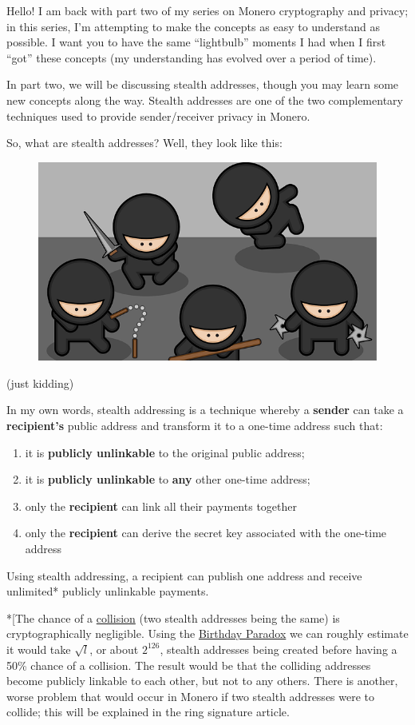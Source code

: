 Hello! I am back with part two of my series on Monero cryptography and privacy; in this series, I'm attempting to make the concepts as easy to understand as possible. I want you to have the same ``lightbulb'' moments I had when I first ``got'' these concepts (my understanding has evolved over a period of time).\par
In part two, we will be discussing stealth addresses, though you may learn some new concepts along the way. Stealth addresses are one of the two complementary techniques used to provide sender/receiver privacy in Monero.\par
So, what are stealth addresses? Well, they look like this:
\begin{figure}[H]
	\centering
	\includegraphics[width=0.8\linewidth]{./images/blog-series/xmr-crypto-luigi1111/stealth-address-kidding.png}
\end{figure}
(just kidding)\par
In my own words, stealth addressing is a technique whereby a \textbf{sender} can take a \textbf{recipient's} public address and transform it to a one-time address such that:
\begin{enumerate}
	\item it is \textbf{publicly unlinkable} to the original public address;
	\item it is \textbf{publicly unlinkable} to \textbf{any} other one-time address;
	\item only the \textbf{recipient} can link all their payments together
	\item only the \textbf{recipient} can derive the secret key associated with the one-time address
\end{enumerate}
Using stealth addressing, a recipient can publish one address and receive unlimited* publicly unlinkable payments.\par

*[The chance of a \href{https://en.wikipedia.org/wiki/Collision_(computer_science)}{collision} (two stealth addresses being the same) is cryptographically negligible. Using the \href{https://en.wikipedia.org/wiki/Birthday_problem}{Birthday Paradox} we can roughly estimate it would take \(\sqrt{l}\), or about \(2^{126}\), stealth addresses being created before having a 50\% chance of a collision. The result would be that the colliding addresses become publicly linkable to each other, but not to any others. There is another, worse problem that would occur in Monero if two stealth addresses were to collide; this will be explained in the ring signature article.\par

